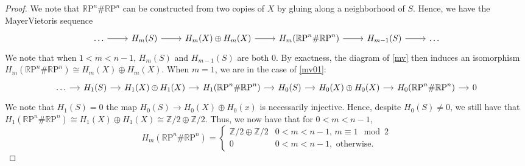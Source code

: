 \documentclass[english]{article}
\newcommand{\RR}{\mathbb{R}}
\newcommand{\ZZ}{\mathbb{Z}}
\theoremstyle{remark}
\theoremstyle{definition}
\newcommand{\RP}{{\RR\mathrm{P}}}
\newcommand{\csm}{\RP^n\#\RP^n}
\begin{document}
\begin{proof}
 We note that $\RP^n\#\RP^n$ can be constructed from two copies of $X$ by gluing along a neighborhood of $S$. Hence, we have the Mayer\textemdash Vietoris sequence
\begin{equation}\begin{tikzcd}
\ldots \arrow[r]&H_m(S)\arrow[r]& H_m(X)\oplus H_m(X)\arrow[r]& H_m(\csm)\arrow[r] &H_{m-1} (S)\arrow[r]&\ldots\label{mv}
\end{tikzcd}\end{equation}
We note that when $1<m<n-1$, $H_m(S)$ and $H_{m-1}(S)$ are both $0$. By exactness, the diagram of \eqref{mv} then induces an isomorphism $H_m(\csm)\cong H_m(X)\oplus H_m(X)$. When $m=1$, we are in the case of \eqref{mv01}:
\begin{equation}\begin{tikzcd}[column sep=small]
\ldots \arrow[r]&H_1(S)\arrow[r]& H_1(X)\oplus H_1(X)\arrow[r]& H_1(\csm)\arrow[r] &H_{0} (S)\arrow[r]&H_0(X)\oplus H_0(X)\arrow[r]& H_0(\csm)\arrow[r]& 0\label{mv01}
\end{tikzcd}\end{equation}
We note that $H_1(S)=0$ the map $H_0(S)\to H_0(X)\oplus H_0(x)$ is necessarily injective. Hence, despite $H_0(S)\neq 0$, we still have that $H_1(\csm)\cong H_1(X)\oplus H_1(X)\cong \ZZ/2\oplus \ZZ/2$. Thus, we now have that for $0<m<n-1$, 
\begin{equation*}
	H_m(\RP^{n}\#\RP^n)=\begin{cases}
\ZZ/2 \oplus \ZZ/2 &0<m<n-1,\, m\equiv 1 \mod 2\\
0& 0<m<n-1, \text{ otherwise}.
\end{cases}
\end{equation*}


\end{proof}
\end{document}
